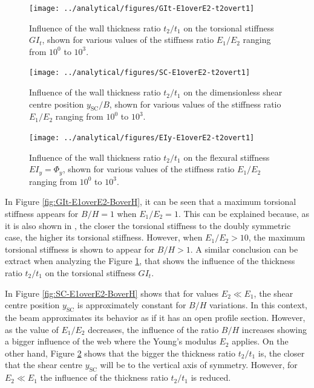     \begin{figure}[!htpb] %
      \centering
      \texttt{[image: ../analytical/figures/GIt-E1overE2-t2overt1]}
      \caption[Influence of the wall thickness ratio $t_2/t_1$ on the torsional stiffness $GI_t$]{Influence of the wall thickness ratio $t_2/t_1$ on the torsional stiffness $GI_t$, shown for various values of the stiffness ratio $E_1/E_2$ ranging from $10^0$ to $10^3$. }\label{fig:GIt-E1overE2-t2overt1}
    \end{figure}

    \begin{figure}[!htpb] %
      \centering
      \texttt{[image: ../analytical/figures/SC-E1overE2-t2overt1]}
      \caption[Influence of the wall thickness ratio $t_2/t_1$ on the dimensionless shear centre position $y_{\mathrm{SC}}/B$]{Influence of the wall thickness ratio $t_2/t_1$ on the dimensionless shear centre position $y_{\mathrm{SC}}/B$, shown for various values of the stiffness ratio $E_1/E_2$ ranging from $10^0$ to $10^3$. }\label{fig:SC-E1overE2-t2overt1}
    \end{figure}

    \begin{figure}[!htpb] %
      \centering
      \texttt{[image: ../analytical/figures/EIy-E1overE2-t2overt1]}
      \caption[Influence of the wall thickness ratio $t_2/t_1$ on the flexural stiffness $EI_y$]{Influence of the wall thickness ratio $t_2/t_1$ on the flexural stiffness $EI_y = \Phi_y$, shown for various values of the stiffness ratio $E_1/E_2$ ranging from $10^0$ to $10^3$. }\label{fig:EIy-E1overE2-t2overt1}
    \end{figure}

    \clearpage
    In Figure \ref{fig:GIt-E1overE2-BoverH}, it can be seen that a maximum torsional stiffness appears for $B/H = 1$ when $E_1/E_2 = 1$. This can be explained because, as it is also shown in \cite{Raither2013a}, the closer the torsional stiffness to the doubly symmetric case, the higher its torsional stiffness. However, when $E_1/E_2 > 10$, the maximum torsional stiffness is shown to appear for $B/H > 1$. A similar conclusion can be extract when analyzing the Figure \ref{fig:GIt-E1overE2-t2overt1}, that shows the influence of the thickness ratio $t_2/t_1$ on the torsional stiffness $G I_t$.

    In Figure \ref{fig:SC-E1overE2-BoverH} shows that for values $E_2 \ll E_1$, the shear centre position $y_{\mathrm{SC}}$ is approximately constant for $B/H$ variations. In this context, the beam approximates its behavior as if it has an open profile section. However, as the value of $E_1/E_2$ decreases, the influence of the ratio $B/H$ increases showing a bigger influence of the web where the Young's modulus $E_2$ applies. On the other hand, Figure \ref{fig:SC-E1overE2-t2overt1} shows that the bigger the thickness ratio $t_2/t_1$ is, the closer that the shear centre $y_{\mathrm{SC}}$ will be to the vertical axis of symmetry. However, for $E_2 \ll E_1$ the influence of the thickness ratio $t_2/t_1$ is reduced.

